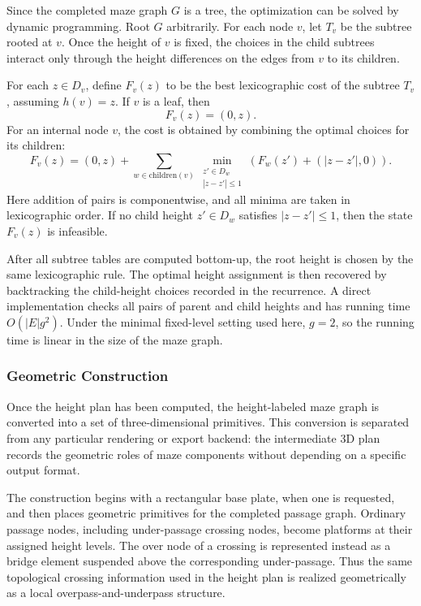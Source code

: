 \documentclass[acmsmall,screen,nonacm]{acmart}
\begin{document}
Since the completed maze graph \(G\) is a tree, the optimization can
be solved by dynamic programming. Root \(G\) arbitrarily. For each
node \(v\), let \(T_v\) be the subtree rooted at \(v\). Once the
height of \(v\) is fixed, the choices in the child subtrees interact
only through the height differences on the edges from \(v\) to its
children.

For each \(z\in D_v\), define \(F_v(z)\) to be the best lexicographic
cost of the subtree \(T_v\), assuming \(h(v)=z\). If \(v\) is a leaf,
then
\[
F_v(z)=(0,z).
\]
For an internal node \(v\), the cost is obtained by combining the
optimal choices for its children:
\[
F_v(z)
=
(0,z)
+
\sum_{w\in \mathrm{children}(v)}
\min_{\substack{z'\in D_w\\ |z-z'|\le 1}}
\left(
F_w(z') + (|z-z'|,0)
\right).
\]
Here addition of pairs is componentwise, and all minima are taken in
lexicographic order. If no child height \(z'\in D_w\) satisfies
\(|z-z'|\le 1\), then the state \(F_v(z)\) is infeasible.

After all subtree tables are computed bottom-up, the root height is
chosen by the same lexicographic rule. The optimal height assignment
is then recovered by backtracking the child-height choices recorded in
the recurrence. A direct implementation checks all pairs of parent and
child heights and has running time \(O(|E|g^2)\). Under the minimal
fixed-level setting used here, \(g=2\), so the running time is linear
in the size of the maze graph.

\subsubsection{Geometric Construction}

Once the height plan has been computed, the height-labeled maze graph
is converted into a set of three-dimensional primitives. This
conversion is separated from any particular rendering or export
backend: the intermediate 3D plan records the geometric roles of maze
components without depending on a specific output format.

The construction begins with a rectangular base plate, when one is
requested, and then places geometric primitives for the completed
passage graph. Ordinary passage nodes, including under-passage
crossing nodes, become platforms at their assigned height levels. The
over node of a crossing is represented instead as a bridge element
suspended above the corresponding under-passage. Thus the same
topological crossing information used in the height plan is realized
geometrically as a local overpass-and-underpass structure.
\end{document}
